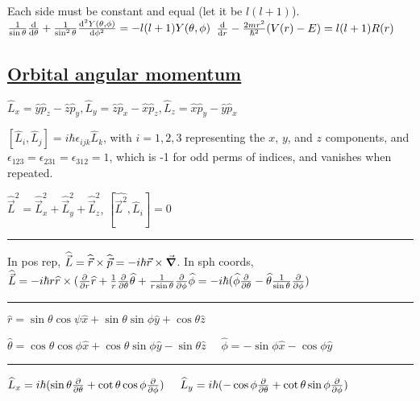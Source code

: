 Each side must be constant and equal (let it be $l(l+1)$).
$\frac{1}{\sin\theta} \dv{}{\theta} (\sin \theta \dv{Y(\theta, \phi)}{\theta}) + \frac{1}{\sin^2 \theta} \dv[2]{Y(\theta, \phi)}{\phi} = -l(l+1)Y(\theta, \phi)$
$\dv{}{r}(r^2 \dv{R(r)}{r}) - \frac{2mr^2}{\hbar^2}(V(r) - E) = l(l+1) R(r)$

\subsection{\underline{Orbital angular momentum}}

$\widehat{L}_x = \widehat{y} \widehat{p}_z - \widehat{z} \widehat{p}_y, \widehat{L}_y = \widehat{z} \widehat{p}_x - \widehat{x} \widehat{p}_z, \widehat{L}_z = \widehat{x} \widehat{p}_y - \widehat{y} \widehat{p}_x$

$[\widehat{L}_i, \widehat{L}_j] = i \hbar \epsilon_{ijk} \widehat{L}_k$, with $i =1, 2, 3$ representing the $x$, $y$, and $z$ components, and $\epsilon_{123} = \epsilon_{231} = \epsilon_{312} = 1$, which is -1 for odd perms of indices, and vanishes when repeated.

$\widehat{\vec{L}}^2 = \widehat{\vec{L}}_x^2 + \widehat{\vec{L}}_y^2 + \widehat{\vec{L}}_z^2$, $[\widehat{\vec{L}^2}, \widehat{L}_i]=0$

\hrule height 0.1pt

In pos rep, $\widehat{\vec{L}} = \widehat{\vec{r}} \times \widehat{\vec{p}} = -i \hbar \vec{r} \times \vec{\grad}$. In sph coords, $\widehat{\vec{L}} = -i \hbar r \widehat{r} \times (\pdv{}{r} \widehat{r} + \frac{1}{r} \pdv{}{\theta} \widehat{\theta} + \frac{1}{r \sin\theta} \pdv{}{\phi} \widehat{\phi} = -i \hbar (\widehat{\phi} \pdv{}{\theta} - \widehat{\theta} \frac{1}{\sin \theta} \pdv{}{\phi})$


\hrule height 0.1pt

$\widehat{r} = \sin \theta \cos \psi \widehat{x} + \sin \theta \sin \phi \widehat{y} + \cos \theta \widehat{z}$

$\widehat{\theta} = \cos{\theta} \cos{\phi} \widehat{x} + \cos{\theta} \sin{\phi} \widehat{y} - \sin{\theta} \widehat{z} \quad$ 
$\widehat{\phi} = - \sin \phi \widehat{x} - \cos \phi \widehat{y}$

\hrule height 0.1pt

$\widehat{L}_x = i \hbar (\sin \theta \pdv{}{\theta} + \cot \theta \cos \phi \pdv{}{\phi}) \quad$
$\widehat{L}_y = i \hbar(-\cos \phi \pdv{}{\theta} + \cot \theta \sin \phi \pdv{}{\phi})$


